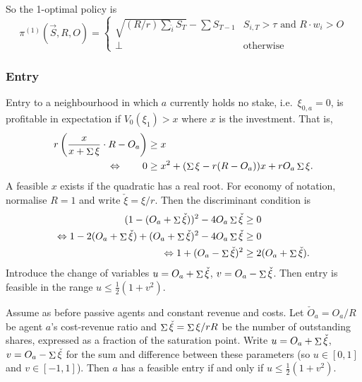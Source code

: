 So the 1-optimal policy is
\[
  \pi^{(1)}(\vec{S},R,O) = \left\{ \begin{array}{ll}
    \sqrt{(R/r)\sum_{\hat{i}}S_T} - \sum S_{T-1} & S_{i,T} > \tau \text { and } R\cdot w_i > O \\
    \bot & \text{otherwise}
  \end{array} \right.
\]



\subsubsection{Entry}
%
Entry to a neighbourhood in which $a$ currently holds no stake, i.e.~$\xi_{0,a}=0$, is profitable in expectation if $V_0(\xi_1) > x$ where $x$ is the investment.
%
That is,
\begin{align*}
  r\left(\frac{x}{x+\mathop{\Sigma}{\xi}} \cdot R - O_a \right) &\geq  x \\
  \Leftrightarrow \qquad  0 &\geq x^2 + (\mathop{\Sigma}\xi - r(R-O_a))x + rO_a\mathop{\Sigma}\xi .
\end{align*}
A feasible $x$ exists if the quadratic has a real root.
%
For economy of notation, normalise $R=1$ and write $\check{\xi}=\xi/r$.
%
Then the discriminant condition is 
\begin{align*}
  (1 - (O_a + \mathop{\Sigma}\check\xi) )^2 - 4O_a\mathop{\Sigma}\check\xi &\geq 0 \\
  \Leftrightarrow 1 - 2(O_a + \mathop{\Sigma}\check\xi) + (O_a + \mathop{\Sigma}\check\xi)^2 - 4O_a\mathop{\Sigma}\check\xi &\geq 0 \\
  \Leftrightarrow 1 + (O_a - \mathop{\Sigma}\check\xi)^2 &\geq 2(O_a + \mathop{\Sigma}\check\xi).
\end{align*}
Introduce the change of variables $u=O_a+\mathop{\Sigma}\check\xi$, $v=O_a - \mathop{\Sigma}\check\xi$.
%
Then entry is feasible in the range $u \leq \frac{1}{2}(1+v^2)$.
%

\begin{proposition*}

  Assume as before passive agents and constant revenue and costs.
  Let $\check{O}_a= O_a/R$ be agent $a$'s cost-revenue ratio and $\mathop{\Sigma}\check\xi = \mathop{\Sigma}\xi/rR$ be the number of outstanding shares, expressed as a fraction of the saturation point.
  Write $u=O_a+\mathop{\Sigma}\check\xi$, $v=O_a - \mathop{\Sigma}\check\xi$ for the sum and difference between these parameters (so $u\in[0,1]$ and $v\in[-1,1]$).
  Then $a$ has a feasible entry if and only if $u \leq \frac{1}{2}(1+v^2)$.

\end{proposition*}

